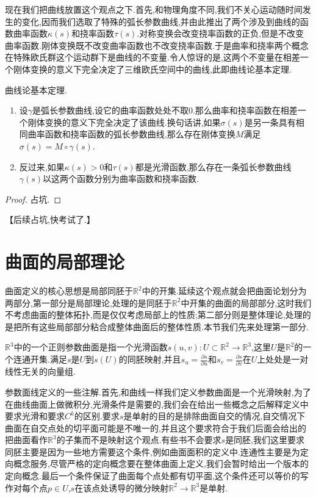 现在我们把曲线放置这个观点之下.首先,和物理角度不同,我们不关心运动随时间发生的变化,因而我们选取了特殊的弧长参数曲线,并由此推出了两个涉及到曲线的函数曲率函数$\kappa(s)$和挠率函数$\tau(s)$.对称变换会改变挠率函数的正负,但是不改变曲率函数.刚体变换既不改变曲率函数也不改变挠率函数.于是曲率和挠率两个概念在特殊欧氏群这个运动群下是曲线的不变量.令人惊讶的是,这两个不变量在相差一个刚体变换的意义下完全决定了三维欧氏空间中的曲线,此即曲线论基本定理.

曲线论基本定理.
\begin{enumerate}
	\item 设$\gamma$是弧长参数曲线,设它的曲率函数处处不取0.那么曲率和挠率函数在相差一个刚体变换的意义下完全决定了该曲线.换句话讲,如果$\sigma(s)$是另一条具有相同曲率函数和挠率函数的弧长参数曲线,那么存在刚体变换$M$满足$\sigma(s)=M\circ\gamma(s)$.
	\item 反过来,如果$\kappa(s)>0$和$\tau(s)$都是光滑函数,那么存在一条弧长参数曲线$\gamma(s)$以这两个函数分别为曲率函数和挠率函数.
\end{enumerate}
\begin{proof}
	占坑.
\end{proof}

【后续占坑,快考试了.】

\section{曲面的局部理论}

曲面定义的核心思想是局部同胚于$\mathbb{R}^2$中的开集.延续这个观点就会把曲面论划分为两部分,第一部分是局部理论,处理的是同胚于$\mathbb{R}^2$中开集的曲面的局部部分,这时我们不考虑曲面的整体拓扑,而是仅仅考虑局部上的性质;第二部分则是整体理论,处理的是把所有这些局部部分粘合成整体曲面后的整体性质.本节我们先来处理第一部分.

$\mathbb{R}^3$中的一个正则参数曲面是指一个光滑函数$s(u,v):U\subset\mathbb{R}^2\to\mathbb{R}^3$,这里$U$是$\mathbb{R}^2$的一个连通开集.满足$s$是$U$到$s(U)$的同胚映射,并且$s_u=\frac{\partial s}{\partial u}$和$s_v=\frac{\partial s}{\partial v}$在$U$上处处是一对线性无关的向量组.

参数面线定义的一些注解.首先,和曲线一样我们定义参数曲面是一个光滑映射,为了在曲线曲面上做微积分,光滑条件是需要的,我们会在给出一些概念之后解释定义中要求光滑和要求$C^k$的区别.要求$s$是单射的目的是排除曲面自交的情况,自交情况下曲面在自交点处的切平面可能是不唯一的,并且这个要求符合于我们后面会给出的把曲面看作$\mathbb{R}^3$的子集而不是映射这个观点.有些书不会要求$s$是同胚,我们这里要求同胚主要是因为一些地方需要这个条件,例如曲面面积的定义中.连通性主要是为定向概念服务,尽管严格的定向概念要在整体曲面上定义,我们会暂时给出一个版本的定向概念.最后一个条件保证了曲面每个点处都有切平面,这个条件还可以等价的写作对每个点$p\in U$,$s$在该点处诱导的微分映射$\mathbb{R}^2\to\mathbb{R}^3$是单射.

